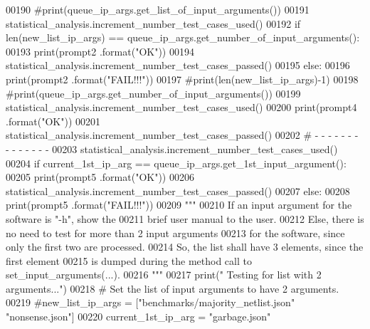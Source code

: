 \begin{DoxyCode}
00190             \textcolor{comment}{#print(queue\_ip\_args.get\_list\_of\_input\_arguments())}
00191         statistical\_analysis.increment\_number\_test\_cases\_used()
00192         \textcolor{keywordflow}{if} len(new\_list\_ip\_args) == queue\_ip\_args.get\_number\_of\_input\_arguments():
00193             print(prompt2 .format(\textcolor{stringliteral}{"OK"}))
00194             statistical\_analysis.increment\_number\_test\_cases\_passed()
00195         \textcolor{keywordflow}{else}:
00196             print(prompt2 .format(\textcolor{stringliteral}{"FAIL!!!"}))
00197             \textcolor{comment}{#print(len(new\_list\_ip\_args)-1)}
00198             \textcolor{comment}{#print(queue\_ip\_args.get\_number\_of\_input\_arguments())}
00199         statistical\_analysis.increment\_number\_test\_cases\_used()
00200         print(prompt4 .format(\textcolor{stringliteral}{"OK"}))
00201         statistical\_analysis.increment\_number\_test\_cases\_passed()
00202         \textcolor{comment}{#   -   -   -   -   -   -   -   -   -   -   -   -   -   -}
00203         statistical\_analysis.increment\_number\_test\_cases\_used()
00204         \textcolor{keywordflow}{if} current\_1st\_ip\_arg == queue\_ip\_args.get\_1st\_input\_argument():
00205             print(prompt5 .format(\textcolor{stringliteral}{"OK"}))
00206             statistical\_analysis.increment\_number\_test\_cases\_passed()
00207         \textcolor{keywordflow}{else}:
00208             print(prompt5 .format(\textcolor{stringliteral}{"FAIL!!!"}))
00209         \textcolor{stringliteral}{"""}
00210 \textcolor{stringliteral}{            If an input argument for the software is "-h", show the}
00211 \textcolor{stringliteral}{                brief user manual to the user.}
00212 \textcolor{stringliteral}{            Else, there is no need to test for more than 2 input arguments}
00213 \textcolor{stringliteral}{                for the software, since only the first two are processed.}
00214 \textcolor{stringliteral}{            So, the list shall have 3 elements, since the first element}
00215 \textcolor{stringliteral}{                is dumped during the method call to set\_input\_arguments(...).}
00216 \textcolor{stringliteral}{        """}
00217         print(\textcolor{stringliteral}{" Testing for list with 2 arguments..."})
00218         \textcolor{comment}{#   Set the list of input arguments to have 2 arguments.}
00219         \textcolor{comment}{#new\_list\_ip\_args = ["benchmarks/majority\_netlist.json" "nonsense.json"]}
00220         current\_1st\_ip\_arg = \textcolor{stringliteral}{"garbage.json"}

\end{DoxyCode}
